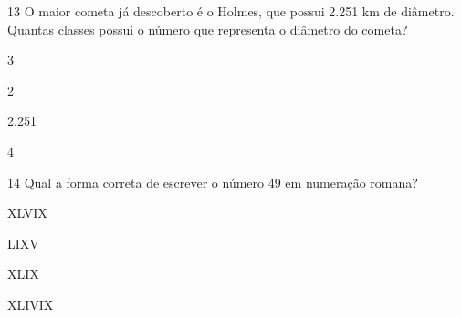 \num{13} O maior cometa já descoberto é o Holmes, que possui 2.251 km de
diâmetro. Quantas classes possui o número que representa o diâmetro do
cometa?

\begin{escolha}
\item 3
\item 2
\item 2.251
\item 4
\end{escolha}






\num{14} Qual a forma correta de escrever o número 49 em numeração romana?

\begin{escolha}
\item XLVIX
\item LIXV
\item XLIX
\item XLIVIX
\end{escolha}




